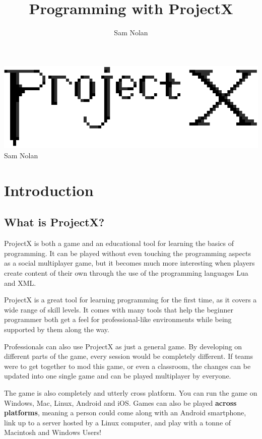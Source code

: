 \documentclass{book}
\author{Sam Nolan}
\title{Programming with ProjectX}
\begin{document}
	\vspace*{\fill}
	\begin{center}
		\centering
		\includegraphics[width=\textwidth]{ProjectX.png}
		Sam Nolan
	\end{center}
	\vspace*{\fill}
	\tableofcontents
	\chapter{Introduction}
	\section{What is ProjectX?}
	ProjectX is both a game and an educational tool for learning the basics of programming. It can be played without even touching the programming aspects as a social multiplayer game, but it becomes much more interesting when players create content of their own through the use of the programming languages Lua and XML.
	
	ProjectX is a great tool for learning programming for the first time, as it covers a wide range of skill levels. It comes with many tools that help the beginner programmer both get a feel for professional-like environments while being supported by them along the way.
	
	Professionals can also use ProjectX as just a general game. By developing on different parts of the game, every session would be completely different. If teams were to get together to mod this game, or even a classroom, the changes can be updated into one single game and can be played multiplayer by everyone. 

	The game is also completely and utterly cross platform. You can run the game on Windows, Mac, Linux, Android and iOS. Games can also be played \textbf{across platforms}, meaning a person could come along with an Android smartphone, link up to a server hosted by a Linux computer, and play with a tonne of Macintosh and Windows Users!
\end{document}
